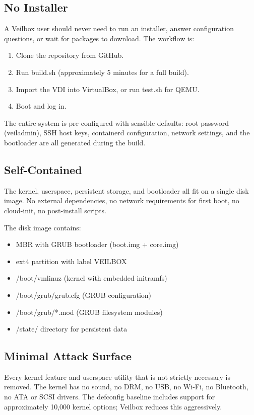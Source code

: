 \subsection{No Installer}

A Veilbox user should never need to run an installer, answer configuration
questions, or wait for packages to download. The workflow is:

\begin{enumerate}[nosep]
  \item Clone the repository from GitHub.
  \item Run build.sh (approximately 5 minutes for a full build).
  \item Import the VDI into VirtualBox, or run test.sh for QEMU.
  \item Boot and log in.
\end{enumerate}

The entire system is pre-configured with sensible defaults: root password
(veiladmin), SSH host keys, containerd configuration, network settings,
and the bootloader are all generated during the build.

\subsection{Self-Contained}

The kernel, userspace, persistent storage, and bootloader all fit on a
single disk image. No external dependencies, no network requirements for
first boot, no cloud-init, no post-install scripts.

The disk image contains:
\begin{itemize}[nosep]
  \item MBR with GRUB bootloader (boot.img + core.img)
  \item ext4 partition with label VEILBOX
  \item /boot/vmlinuz (kernel with embedded initramfs)
  \item /boot/grub/grub.cfg (GRUB configuration)
  \item /boot/grub/*.mod (GRUB filesystem modules)
  \item /state/ directory for persistent data
\end{itemize}

\subsection{Minimal Attack Surface}

Every kernel feature and userspace utility that is not strictly necessary
is removed. The kernel has no sound, no DRM, no USB, no Wi-Fi, no Bluetooth,
no ATA or SCSI drivers. The defconfig baseline includes support for
approximately 10,000 kernel options; Veilbox reduces this aggressively.

